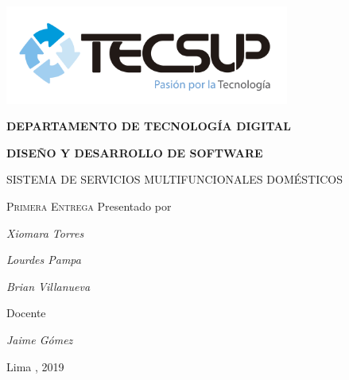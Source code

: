 \begin{titlepage}
	\centering
	\includegraphics[width=0.70\textwidth]{img/logo_tecsup_final}\par\vspace{1cm}
	\vspace{0.30cm}	
	{\scshape\large\bfseries DEPARTAMENTO DE TECNOLOG\'IA DIGITAL \par}
	\vspace{0.60cm}	
	{\scshape\large\bfseries DISEÑO Y DESARROLLO DE SOFTWARE  \par}
	\vspace{2.00cm}		
	{\large\large SISTEMA DE SERVICIOS MULTIFUNCIONALES DOMÉSTICOS \par}
	\vspace{0.70cm}
	{\scshape\large Primera Entrega }
	\vspace{0.60cm}
	\vfill
	Presentado por \par
	{\large\itshape { Xiomara Torres }\par}
	{\large\itshape { Lourdes Pampa }\par}
	{\large\itshape { Brian Villanueva } \par}
	\vspace{0.30cm}
	\vfill
	Docente \par
	{\large\itshape { Jaime Gómez }\par}
	
  \vspace{0.30cm}
	\vfill
        {\large Lima , 2019 \par}
\end{titlepage}

